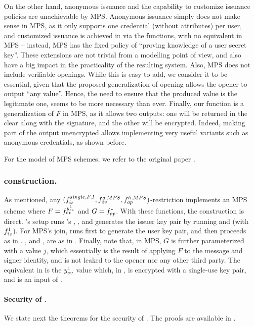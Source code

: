 On the other hand, anonymous issuance and the capability to customize issuance
policies are unachievable by MPS. Anonymous issuance simply does not make sense
in MPS, as it only supports one credential (without attributes) per user, and
customized issuance is achieved in \UAS via the \fissue functions, with no
equivalent in MPS -- instead, MPS has the fixed policy of
``proving knowledge of a user secret key''. These extensions are not trivial
from a modelling point of view, and also have a big impact in the practicality
of the resulting system. Also, MPS does not include verifiable openings. While
this is easy to add, we consider it to be essential, given that the proposed
generalization of opening allows the opener to output ``any value''. Hence, the
need to ensure that the produced value is the legitimate one, seems to be more
necessary than ever. Finally, our \feval function is a generalization of $F$ in
MPS, as it allows two outputs: one will be returned in the clear along with the
signature, and the other will be encrypted. Indeed, making part of the output
unencrypted allows implementing very useful variants such as anonymous
credentials, as shown before.

For the model of MPS schemes, we refer to the original paper \cite{ngsy22}.

\subsubsection{\CUASMPS construction.} %
As mentioned, any $(f_{is}^{single,F,I},f_{ev}^{g,MPS},
f_{op}^{h,MPS})$-restriction implements an MPS scheme where $F=f_{ev}^{y_{ev}^1}$
and $G=f_{op}^\ast$. With these functions, the construction is direct.
\CUASMPS's setup runs \CUASGen's \Setup, \OKeyGen, and generates the issuer key
pair by running \KeyGen and \ISet (with $f_{is}^1$). For MPS's join, \CUASMPS
runs first \KeyGen to generate the user key pair, and then proceeds as in
\CUASGen. \Sign, \Verify and \Open, are as in \CUASGen.
%
Finally, note that, in MPS, $G$ is further parameterized with a value $j$, which
essentially is the result of applying $F$ to the message and signer identity,
and is not leaked to the opener nor any other third party. The equivalent in
\UAS is the $y_{ev}^1$ value which, in \CUASGen, is encrypted with a single-use
key pair, and is an input of \finsp.

\paragraph{Security of \CUASMPS.} %
We state next the theorems for the security of \CUASMPS. The proofs are
available in .

